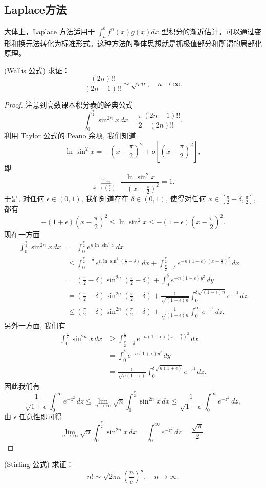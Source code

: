 \documentclass[lang=cn,10pt,thmcnt=section]{elegantbook}
\begin{document}
\subsection{Laplace方法}
大体上，Laplace 方法适用于 $\int_{a}^{b} f^n(x)g(x)dx$ 型积分的渐近估计。可以通过变形和换元法转化为标准形式。这种方法的整体思想就是抓极值部分和所谓的局部化原理。
\begin{example}
	(Wallis 公式) 求证：
\[
\frac{(2n)!!}{(2n-1)!!} \sim \sqrt{\pi n}, \quad n \to \infty.
\]
\end{example}
\begin{proof}
	注意到高数课本积分表的经典公式
$$ \int_0^{\frac{\pi}{2}} \sin^{2n} x \,dx = \frac{\pi}{2} \frac{(2n-1)!!}{(2n)!!}. $$
利用 Taylor 公式的 Peano 余项, 我们知道
$$ \ln \sin^2 x = -\left(x-\frac{\pi}{2}\right)^2 + o\left[\left(x-\frac{\pi}{2}\right)^2\right],  $$
即$$ \lim_{x \to (\frac{\pi}{2})^-} \frac{\ln \sin^2 x}{-(x-\frac{\pi}{2})^2} = 1. $$于是, 对任何 $\epsilon \in (0,1)$, 我们知道存在 $\delta \in (0,1)$, 使得对任何 $x \in [\frac{\pi}{2}-\delta, \frac{\pi}{2}]$,
都有
$$ -(1+\epsilon)\left(x-\frac{\pi}{2}\right)^2 \le \ln \sin^2 x \le -(1-\epsilon)\left(x-\frac{\pi}{2}\right)^2. $$
现在一方面
\begin{align*}
\int_0^{\frac{\pi}{2}} \sin^{2n} x \,dx &= \int_0^{\frac{\pi}{2}} e^{n \ln \sin^2 x} \,dx \\
&\le \int_0^{\frac{\pi}{2}-\delta} e^{n \ln \sin^2(\frac{\pi}{2}-\delta)} \,dx + \int_{\frac{\pi}{2}-\delta}^{\frac{\pi}{2}} e^{-n(1-\epsilon)(x-\frac{\pi}{2})^2} \,dx \\
&= \left(\frac{\pi}{2}-\delta\right) \sin^{2n}\left(\frac{\pi}{2}-\delta\right) + \int_0^\delta e^{-n(1-\epsilon)y^2} \,dy \\
&= \left(\frac{\pi}{2}-\delta\right) \sin^{2n}\left(\frac{\pi}{2}-\delta\right) + \frac{1}{\sqrt{(1-\epsilon)n}} \int_0^{\delta\sqrt{(1-\epsilon)n}} e^{-z^2} \,dz \\
&\le \left(\frac{\pi}{2}-\delta\right) \sin^{2n}\left(\frac{\pi}{2}-\delta\right) + \frac{1}{\sqrt{(1-\epsilon)n}} \int_0^\infty e^{-z^2} \,dz.
\end{align*}
另外一方面, 我们有
\begin{align*}
\int_0^{\frac{\pi}{2}} \sin^{2n} x \,dx &\ge \int_{\frac{\pi}{2}-\delta}^{\frac{\pi}{2}} e^{-n(1+\epsilon)(x-\frac{\pi}{2})^2} \,dx \\
&= \int_0^\delta e^{-n(1+\epsilon)y^2} \,dy \\
&= \frac{1}{\sqrt{n(1+\epsilon)}} \int_0^{\delta\sqrt{n(1+\epsilon)}} e^{-z^2} \,dz.
\end{align*}
因此我们有
$$ \frac{1}{\sqrt{1+\epsilon}} \int_0^\infty e^{-z^2} \,dz \le \lim_{n \to \infty} \sqrt{n} \int_0^{\frac{\pi}{2}} \sin^{2n} x \,dx \le \frac{1}{\sqrt{1-\epsilon}} \int_0^\infty e^{-z^2} \,dz, $$
由 $\epsilon$ 任意性即可得
$$ \lim_{n \to \infty} \sqrt{n} \int_0^{\frac{\pi}{2}} \sin^{2n} x \,dx = \int_0^\infty e^{-z^2} \,dz = \frac{\sqrt{\pi}}{2}. $$

\end{proof}
\begin{example}
	(Stirling 公式) 求证：
\[
n! \sim \sqrt{2\pi n}\left(\frac{n}{e}\right)^n, \quad n \to \infty.
\]

\end{example}
\end{document}
